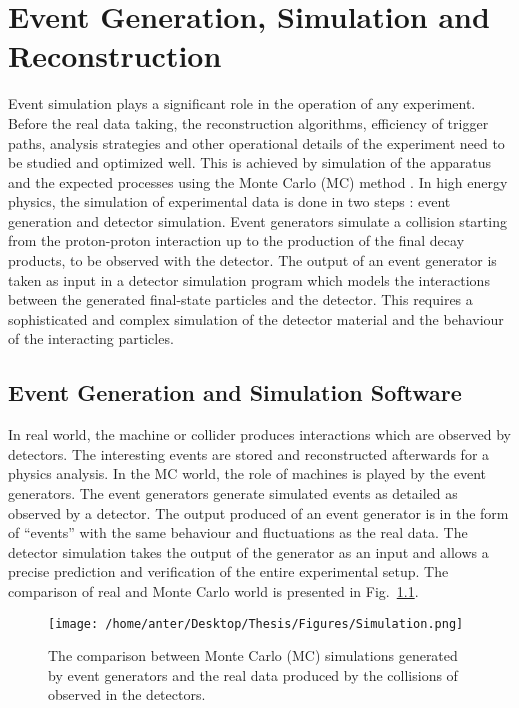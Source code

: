 \chapter{Event Generation, Simulation and Reconstruction}
\label{chap:Reconstruction}
Event simulation plays a significant role in the operation of any experiment. Before the real data taking, the reconstruction algorithms, efficiency of trigger paths, analysis strategies and other operational details of the experiment need to be studied and optimized well. This is achieved by simulation of the apparatus and the expected processes using the Monte Carlo (MC) method \cite{Monte}. In high energy physics, the simulation of experimental data is done in two steps : event generation and detector simulation. Event generators simulate a collision starting from the proton-proton interaction up to the production of the final decay products, to be observed with the detector. The output of an event generator is taken as input in a detector simulation program which models the interactions between the generated final-state particles and the detector. This requires a sophisticated and complex simulation of the detector material and the behaviour of the interacting particles.

\section{Event Generation and Simulation Software}
In real world, the machine or collider produces interactions which are observed by detectors. The interesting events are stored and reconstructed afterwards for a physics analysis. In the MC world, the role of machines is played by the event generators. The event generators generate simulated events as detailed as observed by a detector. The output produced of an event generator is in the form of ``events'' with the same behaviour and fluctuations as the real data. The detector simulation takes the output of the generator as an input and allows a precise prediction and verification of the entire experimental setup. The comparison of real and Monte Carlo world is presented in Fig.~\ref{fig:sim}. %

\begin{figure}[h!]
\begin{center}
\vspace*{2mm} 
\texttt{[image: /home/anter/Desktop/Thesis/Figures/Simulation.png]}\\
\vspace*{4mm} 
\caption{The comparison between Monte Carlo (MC) simulations generated by event generators and the real data produced by the collisions of observed in the detectors.}
\label{fig:sim}
\end{center}
\end{figure}

